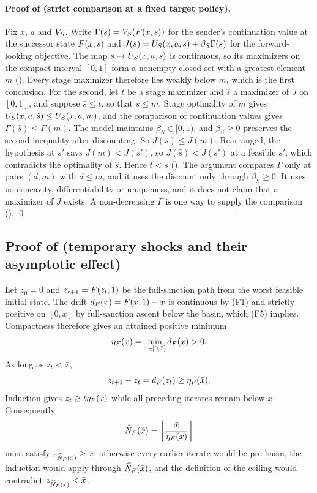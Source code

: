 \paragraph{Proof of  (strict comparison at a fixed target policy).}
Fix $x$, $a$ and $V_S$. Write $\Gamma(s)=V_S(F(x,s))$ for the
sender's continuation value at the successor state $F(x,s)$ and
$J(s)=U_S(x,a,s)+\beta_S\Gamma(s)$ for the forward-looking objective. The map
$s\mapsto U_S(x,a,s)$ is continuous, so its maximizers on the compact interval
$[0,1]$ form a nonempty closed set with a greatest element $m$
(). Every stage maximizer therefore lies
weakly below $m$, which is the first conclusion. For the second, let $t$ be a
stage maximizer and $\hat s$ a maximizer of $J$ on $[0,1]$, and suppose
$\hat s\le t$, so that $\hat s\le m$. Stage optimality of $m$ gives
$U_S(x,a,\hat s)\le U_S(x,a,m)$, and the comparison of continuation values gives
$\Gamma(\hat s)\le\Gamma(m)$. The model maintains $\beta_S\in[0,1)$, and $\beta_S\ge0$
preserves the second inequality after discounting. So $J(\hat s)\le J(m)$.
Rearranged, the hypothesis at $s'$ says $J(m)<J(s')$, so $J(\hat s)<J(s')$ at a feasible
$s'$, which contradicts the optimality of $\hat s$. Hence $t<\hat s$
(). The
argument compares $\Gamma$ only at pairs $(d,m)$ with $d\le m$, and it uses
the discount only through $\beta_S\ge0$. It uses no concavity,
differentiability or uniqueness, and it does not claim that a maximizer of $J$
exists. A non-decreasing $\Gamma$ is one way to supply the comparison
(). \qed

\subsection{Proof of  (temporary shocks and their asymptotic effect)}

Let $z_0=0$ and $z_{t+1}=F(z_t,1)$ be the full-sanction path from the
worst feasible initial state. The drift
$d_{F}(x)=F(x,1)-x$ is continuous by \textup{(F1)} and strictly
positive on $[0,\bar x]$ by full-sanction ascent below the basin, which
\textup{(F5)} implies. Compactness therefore gives
an attained positive minimum
\[
\eta_{F}(\bar x)
=\min_{x\in[0,\bar x]}d_{F}(x)>0.
\]
As long as $z_t<\bar x$,
\[
z_{t+1}-z_t=d_{F}(z_t)\ge\eta_{F}(\bar x).
\]
Induction gives $z_t\ge t\eta_{F}(\bar x)$ while all preceding
iterates remain below $\bar x$. Consequently
\[
\widehat N_{F}(\bar x)
=\left\lceil\frac{\bar x}{\eta_{F}(\bar x)}\right\rceil
\]
must satisfy $z_{\widehat N_{F}(\bar x)}\ge\bar x$: otherwise every
earlier iterate would be pre-basin, the induction would apply through
$\widehat N_{F}(\bar x)$, and the definition of the ceiling would
contradict $z_{\widehat N_{F}(\bar x)}<\bar x$.

